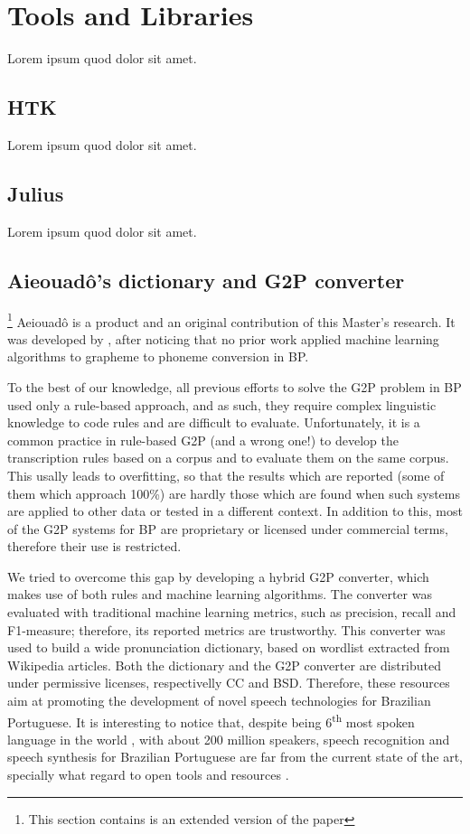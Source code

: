 \section{Tools and Libraries}
Lorem ipsum quod dolor sit amet.

\subsection{HTK}
Lorem ipsum quod dolor sit amet.

\subsection{Julius}
Lorem ipsum quod dolor sit amet.

\subsection{Aieouad\^o's dictionary and G2P converter}\label{sec:aieouado}
\footnote{This section contains is an extended version of the paper}
Aeiouad\^o is a product and an original contribution of this Master's research. It was developed by \citeauthor{Mendonca2014} \cite{Mendonca2014}, after noticing that no prior work applied machine learning algorithms to grapheme to phoneme conversion in \ac{BP}.

To the best of our knowledge, all previous efforts to solve the G2P problem in \ac{BP} used only a rule-based approach, and as such, they require complex linguistic knowledge to code rules and are difficult to evaluate. Unfortunately, it is a common practice in rule-based G2P (and a wrong one!) to develop the transcription rules based on a corpus and to evaluate them on the same corpus. This usally leads to overfitting, so that the results which are reported (some of them which approach 100\%) are hardly those which are found when such systems are applied to other data or tested in a different context. In addition to this, most of the G2P systems for \ac{BP} are proprietary or licensed under commercial terms, therefore their use is restricted.

We tried to overcome this gap by developing a hybrid G2P converter, which makes use of both rules and machine learning algorithms. The converter was evaluated with traditional machine learning metrics, such as precision, recall and F1-measure; therefore, its reported metrics are trustworthy. This converter was used to build a wide pronunciation dictionary, based on wordlist extracted from Wikipedia articles. Both the dictionary and the G2P converter are distributed under permissive licenses, respectivelly \ac{CC} and \ac{BSD}. Therefore, these resources aim at promoting the development of novel speech technologies for Brazilian Portuguese. It is interesting to notice that, despite being 6\textsuperscript{th} most spoken language in the world \cite{Ethnologue2013}, with about 200 million speakers, speech recognition and speech synthesis for Brazilian Portuguese are far from the current state of the art, specially what regard to open tools and resources \cite{Neto2011}. 

